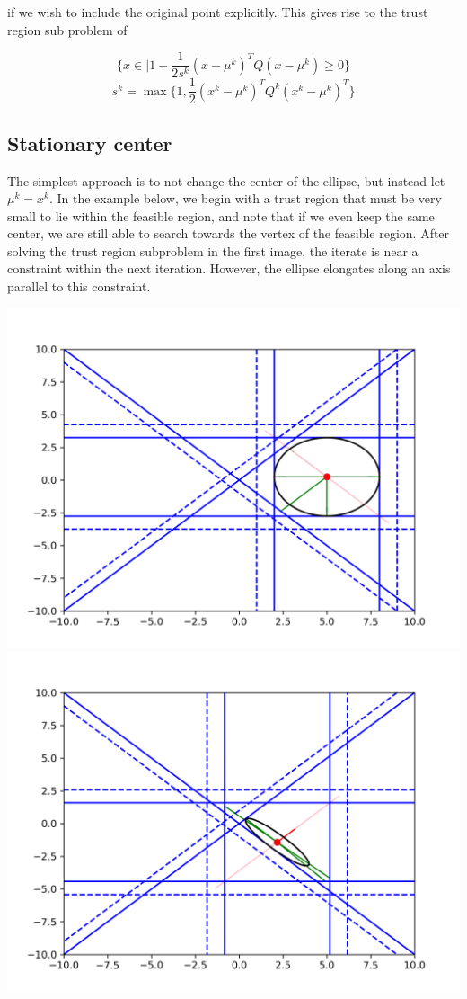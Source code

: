 \documentclass{article}
\begin{document}
if we wish to include the original point explicitly.
This gives rise to the trust region sub problem of

$$\{x \in \mathbb | 1 - \frac 1 {2s^k} (x - \mu^{k})^T Q (x - \mu^{k}) \ge 0\} $$
$$s^k = \max \{1, \frac 1 {2} (x^{k} - \mu^{k})^T Q^k (x^{k} - \mu^{k})^T \}$$






\subsection{Stationary center}
The simplest approach is to not change the center of the ellipse, but instead let $\mu^k = x^k$.
In the example below, we begin with a trust region that must be very small to lie within the feasible region, and note that if we even keep the same center, we are still able to search towards the vertex of the feasible region.
After solving the trust region subproblem in the first image, the iterate is near a constraint within the next iteration.
However, the ellipse elongates along an axis parallel to this constraint.

\includegraphics[scale=0.4]{advantage_of_ellipse_1.png}
\includegraphics[scale=0.4]{advantage_of_ellipse_2.png}
\end{document}
